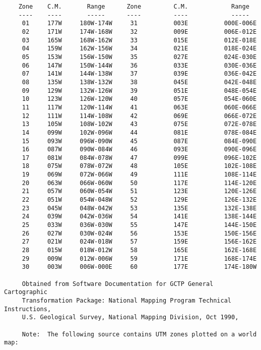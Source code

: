 \begin{verbatim}
    Zone    C.M.       Range      Zone         C.M.            Range
    ----    ----       -----      ----         ----            -----  
     01     177W     180W-174W     31          003E          000E-006E
     02     171W     174W-168W     32          009E          006E-012E
     03     165W     168W-162W     33          015E          012E-018E
     04     159W     162W-156W     34          021E          018E-024E
     05     153W     156W-150W     35          027E          024E-030E
     06     147W     150W-144W     36          033E          030E-036E
     07     141W     144W-138W     37          039E          036E-042E
     08     135W     138W-132W     38          045E          042E-048E
     09     129W     132W-126W     39          051E          048E-054E
     10     123W     126W-120W     40          057E          054E-060E
     11     117W     120W-114W     41          063E          060E-066E
     12     111W     114W-108W     42          069E          066E-072E
     13     105W     108W-102W     43          075E          072E-078E
     14     099W     102W-096W     44          081E          078E-084E
     15     093W     096W-090W     45          087E          084E-090E
     16     087W     090W-084W     46          093E          090E-096E
     17     081W     084W-078W     47          099E          096E-102E
     18     075W     078W-072W     48          105E          102E-108E
     19     069W     072W-066W     49          111E          108E-114E
     20     063W     066W-060W     50          117E          114E-120E
     21     057W     060W-054W     51          123E          120E-126E
     22     051W     054W-048W     52          129E          126E-132E
     23     045W     048W-042W     53          135E          132E-138E
     24     039W     042W-036W     54          141E          138E-144E
     25     033W     036W-030W     55          147E          144E-150E
     26     027W     030W-024W     56          153E          150E-156E
     27     021W     024W-018W     57          159E          156E-162E
     28     015W     018W-012W     58          165E          162E-168E
     29     009W     012W-006W     59          171E          168E-174E
     30     003W     006W-000E     60          177E          174E-180W

     Obtained from Software Documentation for GCTP General Cartographic
     Transformation Package: National Mapping Program Technical Instructions,
     U.S. Geological Survey, National Mapping Division, Oct 1990,

     Note:  The following source contains UTM zones plotted on a world map:


\end{verbatim}
